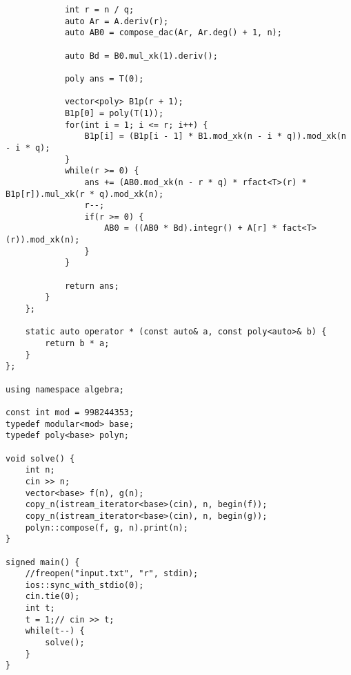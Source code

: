 \begin{lstlisting}
            int r = n / q;
            auto Ar = A.deriv(r);
            auto AB0 = compose_dac(Ar, Ar.deg() + 1, n);
            
            auto Bd = B0.mul_xk(1).deriv();
            
            poly ans = T(0);
            
            vector<poly> B1p(r + 1);
            B1p[0] = poly(T(1));
            for(int i = 1; i <= r; i++) {
                B1p[i] = (B1p[i - 1] * B1.mod_xk(n - i * q)).mod_xk(n - i * q);
            }
            while(r >= 0) {
                ans += (AB0.mod_xk(n - r * q) * rfact<T>(r) * B1p[r]).mul_xk(r * q).mod_xk(n);
                r--;
                if(r >= 0) {
                    AB0 = ((AB0 * Bd).integr() + A[r] * fact<T>(r)).mod_xk(n);
                }
            }
            
            return ans;
        }
    };
    
    static auto operator * (const auto& a, const poly<auto>& b) {
        return b * a;
    }
};

using namespace algebra;

const int mod = 998244353;
typedef modular<mod> base;
typedef poly<base> polyn;

void solve() {
    int n;
    cin >> n;
    vector<base> f(n), g(n);
    copy_n(istream_iterator<base>(cin), n, begin(f));
    copy_n(istream_iterator<base>(cin), n, begin(g));
    polyn::compose(f, g, n).print(n);
}

signed main() {
    //freopen("input.txt", "r", stdin);
    ios::sync_with_stdio(0);
    cin.tie(0);
    int t;
    t = 1;// cin >> t;
    while(t--) {
        solve();
    }
}
\end{lstlisting}
